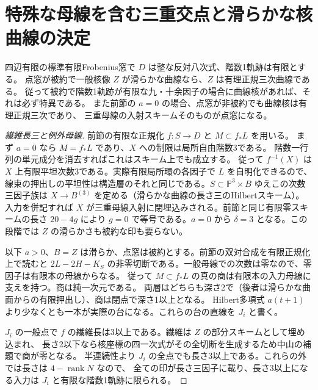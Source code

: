 \section{特殊な母線を含む三重交点と滑らかな核曲線の決定}
\label{sec:smooth-kernel-curve-exclusion}
\begin{theorem}\label{thm:smooth-kernel-curve-exclusion}
四辺有限の標準有限Frobenius窓で $D$ は整な反対八次式、階数1軌跡は有限とする。
点窓が被約で一般核像 $Z$ が滑らかな曲線なら、$Z$ は有理正規三次曲線である。
従って被約で階数1軌跡が有限な九・十余因子の場合に曲線核があれば、それは必ず特異である。
また前節の $a=0$ の場合、点窓が非被約でも曲線核は有理正規三次であり、
三重母線の入射スキームそのものが点窓になる。
\end{theorem}
\begin{proof}[繊維長三と例外母線]
前節の有限な正規化 $f:S\to D$ と $M\subset f_*L$ を用いる。
まず $a=0$ なら $M=f_*L$ であり、$X$ への制限は局所自由階数3である。
階数一行列の単元成分を消去すればこれはスキーム上でも成立する。
従って $f^{-1}(X)$ は $X$ 上有限平坦次数3である。実際有限局所環の各因子で $L$ を自明化できるので、
線束の押出しの平坦性は構造層のそれと同じである。$S\subset\mathbb P^3\times B$ ゆえこの次数三因子族は
$X\to B^{(3)}$ を定める（滑らかな曲線の長さ三のHilbertスキーム）。
入力を併記すれば $X$ が三重母線入射に閉埋込みされる。前節と同じ有限零スキームの長さ $20-4g$ により
$g=0$ で等号である。$a=0$ から $\delta=3$ となる。この段階では $Z$ の滑らかさも被約な印も要らない。

以下 $a>0$、$B=Z$ は滑らか、点窓は被約とする。前節の双対合成を有限正規化上で読むと
$2L-2H-K_S$ の非零切断である。一般母線での次数は零なので、零因子は有限本の母線からなる。
従って $M\subset f_*L$ の真の商は有限本の入力母線に支えを持つ。商は純一次元である。
両層はどちらも深さ2で（後者は滑らかな曲面からの有限押出し）、商は閉点で深さ1以上となる。
Hilbert多項式 $a(t+1)$ より少なくとも一本が実際の台になる。これらの台の直線を $J_i$ と書く。

$J_i$ の一般点で $f$ の繊維長は3以上である。繊維は $Z$ の部分スキームとして埋め込まれ、
長さ2以下なら核座標の四一次式がその全切断を生成するため中山の補題で商が零となる。
半連続性より $J_i$ の全点でも長さ3以上である。これらの外では長さは $4-\operatorname{rank}N$ なので、
全ての印が長さ三因子に載り、長さ3以上になる入力は $J_i$ と有限な階数1軌跡に限られる。
\end{proof}
